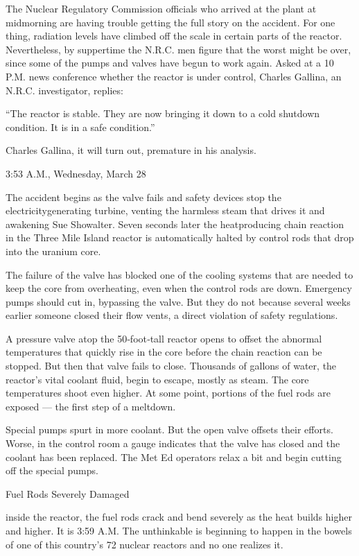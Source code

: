 The Nuclear Regulatory Commission officials who arrived at the plant at
midmorning are having trouble getting the full story on the accident.
For one thing, radiation levels have climbed off the scale in certain
parts of the reactor. Nevertheless, by suppertime the N.R.C. men figure
that the worst might be over, since some of the pumps and valves have
begun to work again. Asked at a 10 P.M. news conference whether the
reactor is under control, Charles Gallina, an N.R.C. investigator,
replies:

``The reactor is stable. They are now bringing it down to a cold
shutdown condition. It is in a safe condition.''

Charles Gallina, it will turn out, premature in his analysis.

3:53 A.M., Wednesday, March 28

The accident begins as the valve fails and safety devices stop the
electricitygenerating turbine, venting the harmless steam that drives it
and awakening Sue Showalter. Seven seconds later the heatproducing chain
reaction in the Three Mile Island reactor is automatically halted by
control rods that drop into the uranium core.

The failure of the valve has blocked one of the cooling systems that are
needed to keep the core from overheating, even when the control rods are
down. Emergency pumps should cut in, bypassing the valve. But they do
not because several weeks earlier someone closed their flow vents, a
direct violation of safety regulations.

A pressure valve atop the 50‐foot‐tall reactor opens to offset the
abnormal temperatures that quickly rise in the core before the chain
reaction can be stopped. But then that valve fails to close. Thousands
of gallons of water, the reactor's vital coolant fluid, begin to escape,
mostly as steam. The core temperatures shoot even higher. At some point,
portions of the fuel rods are exposed --- the first step of a meltdown.

Special pumps spurt in more coolant. But the open valve offsets their
efforts. Worse, in the control room a gauge indicates that the valve has
closed and the coolant has been replaced. The Met Ed operators relax a
bit and begin cutting off the special pumps.

Fuel Rods Severely Damaged

inside the reactor, the fuel rods crack and bend severely as the heat
builds higher and higher. It is 3:59 A.M. The unthinkable is beginning
to happen in the bowels of one of this country's 72 nuclear reactors and
no one realizes it.

